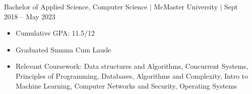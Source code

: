 \documentclass[12pt]{article}
\newcommand{\textDate}[3]{\noindent#1 $|$ #2 $|$ {\color{textGray} #3}}
\begin{document}
    \textDate{Bachelor of Applied Science, Computer Science}{McMaster University}{Sept 2018 -- May 2023}
    \begin{small}
        \begin{itemize}
            \itemsep0em 
            \item Cumulative GPA: {11.5/12}
            \item Graduated Summa Cum Laude
            \item Relevant Coursework: {Data structures and Algorithms, Concurrent Systems, Principles of Programming, Databases, Algorithms and Complexity, Intro to Machine Learning, Computer Networks and Security, Operating Systems}
        \end{itemize}
    \end{small}
\end{document}
